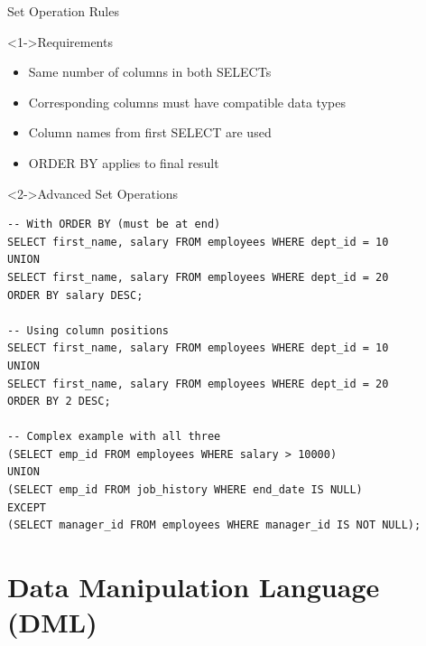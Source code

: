 \documentclass[aspectratio=169,11pt]{beamer}
\begin{document}
\begin{frame}[fragile]{Set Operation Rules}
\begin{block}<1->{Requirements}
\begin{itemize}
    \item Same number of columns in both SELECTs
    \item Corresponding columns must have compatible data types
    \item Column names from first SELECT are used
    \item ORDER BY applies to final result
\end{itemize}
\end{block}

\pause
\begin{exampleblock}<2->{Advanced Set Operations}
\begin{lstlisting}
-- With ORDER BY (must be at end)
SELECT first_name, salary FROM employees WHERE dept_id = 10
UNION
SELECT first_name, salary FROM employees WHERE dept_id = 20
ORDER BY salary DESC;

-- Using column positions
SELECT first_name, salary FROM employees WHERE dept_id = 10
UNION
SELECT first_name, salary FROM employees WHERE dept_id = 20
ORDER BY 2 DESC;

-- Complex example with all three
(SELECT emp_id FROM employees WHERE salary > 10000)
UNION
(SELECT emp_id FROM job_history WHERE end_date IS NULL)
EXCEPT
(SELECT manager_id FROM employees WHERE manager_id IS NOT NULL);
\end{lstlisting}
\end{exampleblock}
\end{frame}

\section{Data Manipulation Language (DML)}
\end{document}
